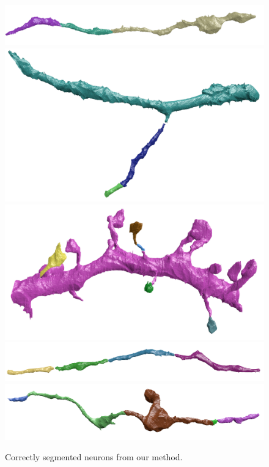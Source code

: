 \begin{figure}[t]
	\centering
	\includegraphics[width=0.85\linewidth]{./figures/multicut-correct1.png}
	\includegraphics[width=0.85\linewidth]{./figures/multicut-correct2.png}
	\includegraphics[width=0.85\linewidth]{./figures/multicut-correct3.png}
	\includegraphics[width=0.85\linewidth]{./figures/multicut-correct4.png}
	\includegraphics[width=0.85\linewidth]{./figures/multicut-correct5.png}
	\caption{Correctly segmented neurons from our method.}
	\label{fig:positive-results}
\end{figure}

